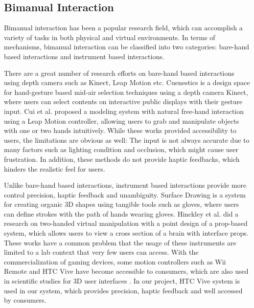 \documentclass{svjour3}                     %
\begin{document}
\subsection{Bimanual Interaction}
\label{sec:2.1}
Bimanual interaction has been a popular research field, which can accomplish a variety of tasks in both physical and virtual environments.
In terms of mechanisms, bimanual interaction can be classified into two categories: bare-hand based interactions and instrument based interactions.

There are a great number of research efforts \cite{walter2014cuenesics,cui2016exploration,ramani2015gesture,murugappan2013handy,han2014virtual} on bare-hand based interactions using depth camera such as Kinect, Leap Motion etc.
Cuenestics \cite{walter2014cuenesics} is a design space for hand-gesture based mid-air selection techniques using a depth camera Kinect, where users can select contents on interactive public displays with their gesture input.
Cui et al. \cite{cui2016exploration} proposed a modeling system with natural free-hand interaction using a Leap Motion controller, allowing users to grab and manipulate objects with one or two hands intuitively.
While these works provided accessibility to users, the limitations are obvious as well: The input is not always accurate due to many factors such as lighting condition and occlusion, which might cause user frustration.
In addition, these methods do not provide haptic feedbacks, which hinders the realistic feel for users.

Unlike bare-hand based interactions, instrument based interactions provide more control precision, haptic feedback and unambiguity.
Surface Drawing \cite{schkolne2001surface} is a system for creating organic 3D shapes using tangible tools such as gloves, where users can define strokes with the path of hands wearing gloves.
Hinckley et al. \cite{hinckley1998two} did a research on two-handed virtual manipulation with a point design of a prop-based system, which allows users to view a cross section of a brain with interface props.
These works have a common problem that the usage of these instruments are limited to a lab context that very few users can access.
%
With the commercialization of gaming devices, some motion controllers such as Wii Remote and HTC Vive have become accessible to consumers, which are also used in scientific studies for 3D user interfaces \cite{wingcrave2010wii,niehorster2017accuracy}.
%
In our project, HTC Vive system is used in our system, which provides precision, haptic feedback and well accessed by consumers.
\end{document}
